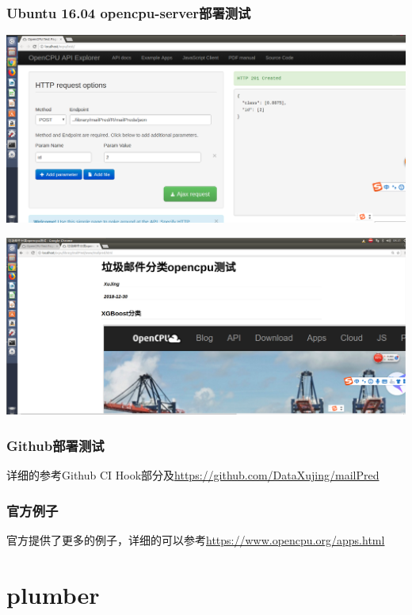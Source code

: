 \documentclass[]{book}
\begin{document}
\subsection{Ubuntu 16.04
opencpu-server部署测试}\label{ubuntu-16.04-opencpu-server}

\includegraphics{pic/opencpu/p17.png}

\includegraphics{pic/opencpu/p18.png}

\subsection{Github部署测试}\label{github}

详细的参考Github CI
Hook部分及\url{https://github.com/DataXujing/mailPred}

\subsection{官方例子}

官方提供了更多的例子，详细的可以参考\url{https://www.opencpu.org/apps.html}

\chapter{plumber}\label{plumber}
\end{document}
